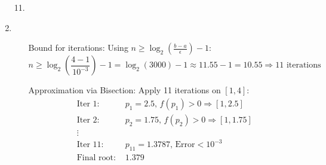 \begin{enumerate}
    \item[11.]
    \item
      \begin{itemize}
        \item[Bound for iterations:]
          Using \( n \geq \log_2\left(\frac{b - a}{\epsilon}\right) - 1 \):
          \[
            n \geq \log_2\left(\frac{4 - 1}{10^{-3}}\right) - 1 =
            \log_2(3000) - 1 \approx 11.55 - 1 = 10.55 \Rightarrow
            \boxed{11} \text{ iterations}
          \]

        \item[Approximation via Bisection:] Apply 11 iterations on \( [1, 4] \):
          \[
            \begin{aligned}
              \text{Iter 1: } & p_1 = 2.5, \, f(p_1) > 0 \Rightarrow [1, 2.5] \\
              \text{Iter 2: } & p_2 = 1.75, \, f(p_2) > 0 \Rightarrow
              [1, 1.75] \\
              \vdots \\
              \text{Iter 11: } & p_{11} = 1.3787, \, \text{Error} < 10^{-3} \\
              \text{Final root: } & \boxed{1.379}
            \end{aligned}
          \]
      \end{itemize}

  \end{enumerate}